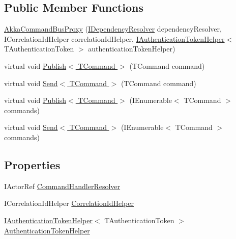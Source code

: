 \subsection*{Public Member Functions}
\begin{DoxyCompactItemize}
\item 
\hyperlink{classCqrs_1_1Akka_1_1Commands_1_1AkkaCommandBusProxy_ad9a3fa7aa546bc2c398d4f52d0659656}{Akka\+Command\+Bus\+Proxy} (\hyperlink{interfaceCqrs_1_1Configuration_1_1IDependencyResolver}{I\+Dependency\+Resolver} dependency\+Resolver, I\+Correlation\+Id\+Helper correlation\+Id\+Helper, \hyperlink{interfaceCqrs_1_1Authentication_1_1IAuthenticationTokenHelper}{I\+Authentication\+Token\+Helper}$<$ T\+Authentication\+Token $>$ authentication\+Token\+Helper)
\item 
virtual void \hyperlink{classCqrs_1_1Akka_1_1Commands_1_1AkkaCommandBusProxy_a410c0fe52016d04de950b1ae767d2ccb}{Publish$<$ T\+Command $>$} (T\+Command command)
\item 
virtual void \hyperlink{classCqrs_1_1Akka_1_1Commands_1_1AkkaCommandBusProxy_a15945f41b7439e722f5608f48b63c6d9}{Send$<$ T\+Command $>$} (T\+Command command)
\item 
virtual void \hyperlink{classCqrs_1_1Akka_1_1Commands_1_1AkkaCommandBusProxy_a81dc8162ca933d84b6aee04aff589010}{Publish$<$ T\+Command $>$} (I\+Enumerable$<$ T\+Command $>$ commands)
\item 
virtual void \hyperlink{classCqrs_1_1Akka_1_1Commands_1_1AkkaCommandBusProxy_a30115e2f8c964967aa8fe94712ece7c2}{Send$<$ T\+Command $>$} (I\+Enumerable$<$ T\+Command $>$ commands)
\end{DoxyCompactItemize}
\subsection*{Properties}
\begin{DoxyCompactItemize}
\item 
I\+Actor\+Ref \hyperlink{classCqrs_1_1Akka_1_1Commands_1_1AkkaCommandBusProxy_afab0340ffb172da48584dce148f3defd}{Command\+Handler\+Resolver}
\item 
I\+Correlation\+Id\+Helper \hyperlink{classCqrs_1_1Akka_1_1Commands_1_1AkkaCommandBusProxy_aa554035c12060c7eedb0b982ac490da8}{Correlation\+Id\+Helper}
\item 
\hyperlink{interfaceCqrs_1_1Authentication_1_1IAuthenticationTokenHelper}{I\+Authentication\+Token\+Helper}$<$ T\+Authentication\+Token $>$ \hyperlink{classCqrs_1_1Akka_1_1Commands_1_1AkkaCommandBusProxy_a6faae6227f1da33928e54a775466f9c9}{Authentication\+Token\+Helper}
\end{DoxyCompactItemize}


